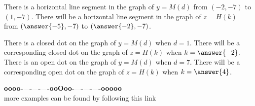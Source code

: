 \documentclass{ximera}
\begin{document}
\begin{example}
\begin{question}
\end{question}


\begin{question}

There is a horizontal line segment in the graph of $y = M(d)$ from $(-2, -7)$ to $(1, -7)$.  There will be a horizontal line segment in the graph of $z = H(k)$ from $\left(\answer{-5}, -7\right)$ to $\left(\answer{-2}, -7\right)$.

\end{question}



\begin{question}

There is a closed dot on the graph of $y= M(d)$  when $d = 1$.  There will be a corresponding closed dot on the graph of $z = H(k)$ when $k = \answer{-2}$. \\


There is an open dot on the graph of $y= M(d)$  when $d = 7$.  There will be a corresponding open dot on the graph of $z = H(k)$ when $k = \answer{4}$.

\end{question}




\end{example}













































\begin{center}
\textbf{\textcolor{green!50!black}{oooo-=-=-=-ooOoo-=-=-=-ooooo}} \\

more examples can be found by following this link\\ 

\end{center}
\end{document}
